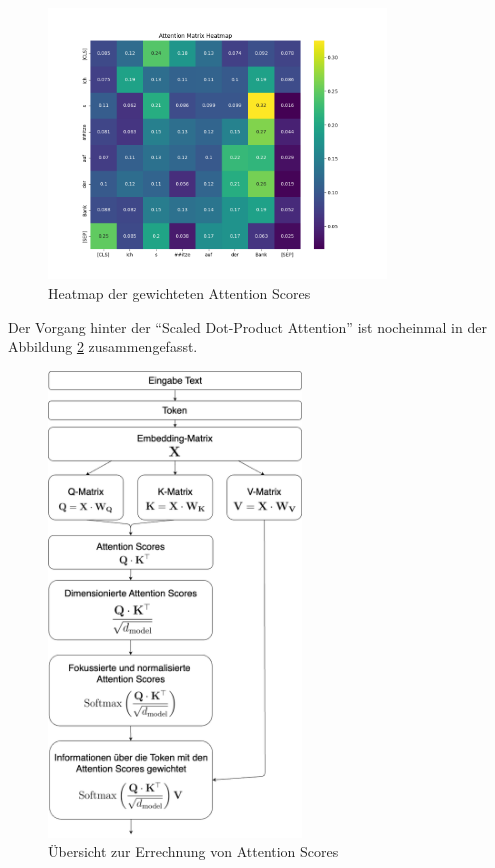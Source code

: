 \begin{figure}[ht]
	\centering
	\includegraphics[width=0.8\textwidth]{Bilder/attention_matrix_heatmap.png} 
	\caption{Heatmap der gewichteten Attention Scores}
	\label{fig:heatmap}
\end{figure}

Der Vorgang hinter der \enquote{Scaled Dot-Product Attention} ist nocheinmal in der Abbildung \ref{fig:scaled-dot} zusammengefasst.

\begin{figure}[ht]
	\centering
	\includegraphics[width=0.6\textwidth]{Bilder/scaled-dot-attention-math.png} 
	\caption{Übersicht zur Errechnung von Attention Scores}
	\label{fig:scaled-dot}
\end{figure}